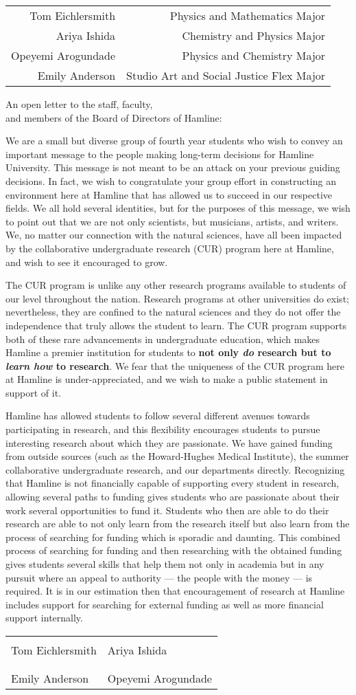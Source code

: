 \documentclass[12pt]{article}
\makeatletter
\newcommand{\signers}{
	\begin{table}[h]
	\raggedleft
	\begin{tabular}{rr}
		Tom Eichlersmith & Physics and Mathematics Major \\
		Ariya Ishida & Chemistry and Physics Major \\
		Opeyemi Arogundade & Physics and Chemistry Major \\
		Emily Anderson & Studio Art and Social Justice Flex Major
	\end{tabular}
	\end{table}
}
\newcommand{\opening}{
	\vskip 5mm
	\noindent
	An open letter to the staff, faculty, \\and members of the Board of Directors of Hamline:
	\vskip 5mm
}
\newcommand{\signatures}{
	\vskip 5mm
	\begin{table}
	\begin{tabular}{@{}p{0.5\textwidth}p{0.5\textwidth}@{}}
		\hrulefill & \hrulefill \\
		Tom Eichlersmith & Ariya Ishida \\
		& \\
		\hrulefill & \hrulefill \\
		Emily Anderson & Opeyemi Arogundade  \\
	\end{tabular}
	\end{table}
}
\makeatother
\begin{document}

\signers

\opening

We are a small but diverse group of fourth year students who wish to convey an important message to the people making long-term decisions for Hamline University.
This message is not meant to be an attack on your previous guiding decisions.
In fact, we wish to congratulate your group effort in constructing an environment here at Hamline that has allowed us to succeed in our respective fields.
We all hold several identities, but for the purposes of this message, we wish to point out that we are not only scientists, but musicians, artists, and writers.
We, no matter our connection with the natural sciences, have all been impacted by the collaborative undergraduate research (CUR) program here at Hamline, and wish to see it encouraged to grow.

The CUR program is unlike any other research programs available to students of our level throughout the nation.
Research programs at other universities do exist; nevertheless, they are confined to the natural sciences and they do not offer the independence that truly allows the student to learn.
The CUR program supports both of these rare advancements in undergraduate education, which makes Hamline a premier institution for students to \textbf{not only \emph{do} research but to \emph{learn how} to research}.
We fear that the uniqueness of the CUR program here at Hamline is under-appreciated, and we wish to make a public statement in support of it.

Hamline has allowed students to follow several different avenues towards participating in research, and this flexibility encourages students to pursue interesting research about which they are passionate.
We have gained funding from outside sources (such as the Howard-Hughes Medical Institute), the summer collaborative undergraduate research, and our departments directly.
Recognizing that Hamline is not financially capable of supporting every student in research, allowing several paths to funding gives students who are passionate about their work several opportunities to fund it.
Students who then are able to do their research are able to not only learn from the research itself but also learn from the process of searching for funding which is sporadic and daunting.
This combined process of searching for funding and then researching with the obtained funding gives students several skills that help them not only in academia but in any pursuit where an appeal to authority --- the people with the money --- is required.
It is in our estimation then that encouragement of research at Hamline includes support for searching for external funding as well as more financial support internally.


\signatures
\end{document}
